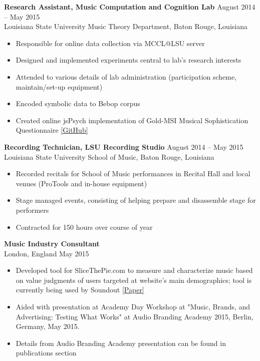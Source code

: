 \textbf{Research Assistant, Music Computation and Cognition Lab} \hfill August 2014 -- May 2015 \\
Louisiana State University Music Theory Department, Baton Rouge, Louisiana \hfill 
\begin{itemize} \itemsep -2pt %
\item  Responsible for online data collection via MCCL@LSU server
\item  Designed and implemented experiments central to lab's research interests
\item  Attended to various details of lab administration (participation scheme, maintain/set-up equipment)
\item  Encoded symbolic data to Bebop corpus
\item  Created online jsPsych implementation of Gold-MSI Musical Sophistication Questionnaire \href{https://github.com/davidjohnbaker1/jspsych_gold_msi_survey}{[GitHub]}
\end{itemize}

\textbf{Recording Technician, LSU Recording Studio} \hfill August 2014 -- May 2015 \\
Louisiana State University School of Music, Baton Rouge, Louisiana \hfill 
\begin{itemize} \itemsep -2pt %
\item  Recorded recitals for School of Music performances in Recital Hall and local venues (ProTools and in-house equipment)
\item  Stage managed events, consisting of helping prepare and disassemble stage for performers
\item Contracted for 150 hours over course of year
\end{itemize}

\textbf{Music Industry Consultant} \\[2pt]
London, England \hfill May 2015 
\begin{itemize} \itemsep -2pt %
\item Developed tool for SliceThePie.com to measure and characterize music based on value judgments of users targeted at website's main demographics; tool is currently being used by Soundout \href{https://www.researchgate.net/publication/306374399_Matching_Music_to_Brand_Personality_A_Semantic_Differential_Tool_for_Measuring_Emotional_Space}{[Paper]}
\item Aided with presentation at Academy Day Workshop at "Music, Brands, and Advertising: Testing What Works" at Audio Branding Academy 2015, Berlin, Germany, May 2015.
\item Details from Audio Branding Academy presentation can be found in publications section
\end{itemize} 

